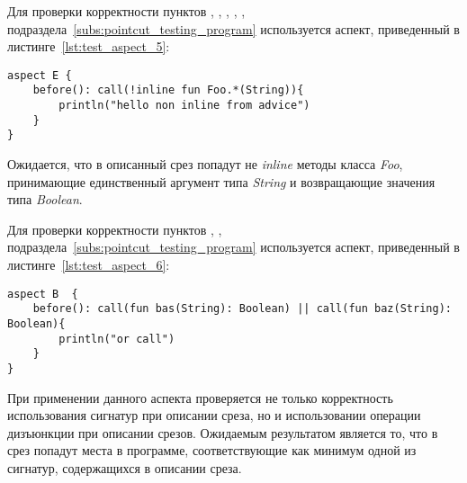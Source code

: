 Для проверки корректности пунктов \quotes{\ref{list:method_name_check}},
\quotes{\ref{list:class_name_check}},
\quotes{\ref{list:method_params_check}},
\quotes{\ref{list:method_modifiers_check}},
\quotes{\ref{list:method_inline_check}},
\quotes{\ref{list:logic_operations_check}} подраздела~\ref{subs:pointcut_testing_program} используется аспект, приведенный в листинге~\ref{lst:test_aspect_5}:
\begin{lstlisting}[style={java}, label={lst:test_aspect_5},
  caption={Пример тестового аспекта}]
aspect E {
    before(): call(!inline fun Foo.*(String)){
        println("hello non inline from advice")
    }
}
\end{lstlisting}
Ожидается, что в описанный срез попадут не \textit{inline} методы класса \textit{Foo}, принимающие единственный аргумент типа \textit{String} и возвращающие значения типа \textit{Boolean}.

 Для проверки корректности пунктов
 \quotes{\ref{list:method_name_check}},
 \quotes{\ref{list:class_name_check}},
 \quotes{\ref{list:logic_operations_check}} подраздела~\ref{subs:pointcut_testing_program} используется аспект, приведенный в листинге~\ref{lst:test_aspect_6}:
\begin{lstlisting}[style={java}, label={lst:test_aspect_6},
  caption={Пример тестового аспекта}]
aspect B  {
    before(): call(fun bas(String): Boolean) || call(fun baz(String): Boolean){
        println("or call")
    }
}
\end{lstlisting}
При применении данного аспекта проверяется не только корректность использования сигнатур при описании среза, но и использовании операции дизъюнкции при описании срезов.
Ожидаемым результатом является то, что в срез попадут места в программе, соответствующие как минимум одной из сигнатур, содержащихся в описании среза.
